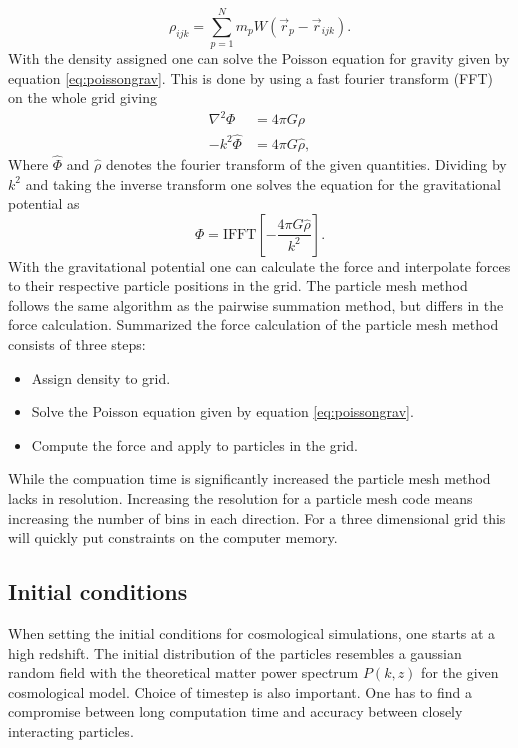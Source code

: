 \begin{equation}
    \rho_{ijk}=\sum_{p=1}^Nm_pW(\vec{r}_p-\vec{r}_{ijk}).
\end{equation}
With the density assigned one can solve the Poisson equation for gravity given
by equation \ref{eq:poissongrav}. This is done by using a fast fourier transform
(FFT) on the whole grid giving
\begin{align}
    \nabla^2\Phi&=4\pi G\rho\\
    -k^2 \hat{\Phi}&=4\pi G \hat{\rho},
\end{align}
Where $\hat{\Phi}$ and $\hat{\rho}$ denotes the fourier transform of the given
quantities. Dividing by $k^2$ and taking the inverse transform one solves the
equation for the gravitational potential as
\begin{equation}
    \Phi = \mathrm{IFFT}[-\frac{4\pi G \hat{\rho}}{k^2}].
\end{equation}
With the gravitational potential one can calculate the force and interpolate
forces to their respective particle positions in the grid. The particle mesh
method follows the same algorithm as the pairwise summation method, but differs
in the force calculation. Summarized the force calculation of the particle mesh
method consists of three steps:
\begin{itemize}
    \item Assign density to grid. \\
    \item Solve the Poisson equation given by equation \ref{eq:poissongrav}.\\
    \item Compute the force and apply to particles in the grid.
\end{itemize}
While the compuation time is significantly increased the
particle mesh method lacks in resolution. Increasing the resolution for a
particle mesh code means increasing the number of bins in each direction. For a
three dimensional grid this will quickly put constraints on the computer memory.

\subsection{Initial conditions}
When setting the initial conditions for cosmological simulations, one starts at
a high redshift. The initial distribution of the particles resembles a gaussian
random field with the theoretical matter power spectrum $P(k,z)$ for the given
cosmological model. Choice of timestep is also important. One has to find a
compromise between long computation time and accuracy between closely
interacting particles.

